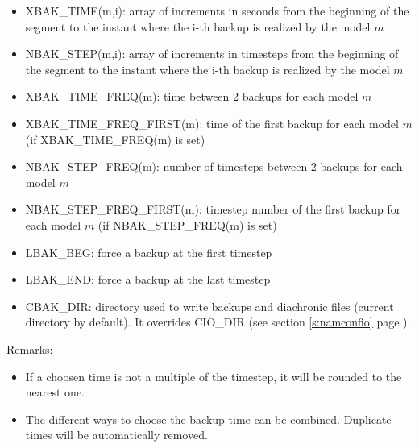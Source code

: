 \begin{itemize}
\item
{} 
XBAK\_TIME(m,i): array of increments in seconds from the beginning of the segment to the instant where the i-th backup is realized by the model $m$

\item
{} 
NBAK\_STEP(m,i): array of increments in timesteps from the beginning of the segment to the instant where the i-th backup is realized by the model $m$

\item
{} 
XBAK\_TIME\_FREQ(m): time between 2 backups for each model $m$

\item
{} 
XBAK\_TIME\_FREQ\_FIRST(m): time of the first backup for each model $m$ \\
(if XBAK\_TIME\_FREQ(m) is set)

\item
{} 
NBAK\_STEP\_FREQ(m): number of timesteps between 2 backups for each model $m$

\item
{} 
NBAK\_STEP\_FREQ\_FIRST(m): timestep number of the first backup for each model $m$ (if NBAK\_STEP\_FREQ(m) is set)

\item
{} 
LBAK\_BEG: force a backup at the first timestep

\item
{} 
LBAK\_END: force a backup at the last timestep

\item
{} 
CBAK\_DIR: directory used to write backups and diachronic files (current directory by default).
It overrides CIO\_DIR (see section \ref{s:namconfio} page \pageref{s:namconfio}).
\end{itemize}

Remarks:
\begin{itemize}
\item If a choosen time is not a multiple of the timestep, it will be rounded to the nearest one.
\item The different ways to choose the backup time can be combined. Duplicate times will be automatically removed.
\end{itemize}

